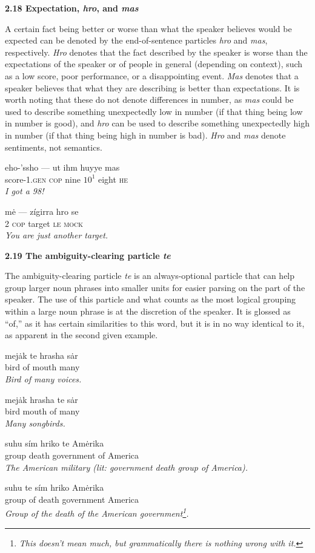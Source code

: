 \documentclass{article}[10pt]
\begin{document}
{\bf 2.18 Expectation, \emph{hro}, and \emph{mas}}

A certain fact being better or worse than what the speaker believes would be expected can be denoted by the end-of-sentence particles \emph{hro} and \emph{mas}, respectively. \emph{Hro} denotes that the fact described by the speaker is worse than the expectations of the speaker or of people in general (depending on context), such as a low score, poor performance, or a disappointing event. \emph{Mas} denotes that a speaker believes that what they are describing is better than expectations. It is worth noting that these do not denote differences in number, as \emph{mas} could be used to describe something unexpectedly low in number (if that thing being low in number is good), and \emph{hro} can be used to describe something unexpectedly high in number (if that thing being high in number is bad). \emph{Hro} and \emph{mas} denote sentiments, not semantics.
\begin{exe}
\ex 
\gll eho-'ssho --- ut ihm huyye mas\\
score-\textsc{1.gen} \textsc{cop} nine $10^1$ eight \textsc{he}\\
\trans \emph{I got a 98!}

\ex
\gll m\.{e} --- z\'{i}girra hro se\\
2 \textsc{cop} target \textsc{le} \textsc{mock}\\
\trans \emph{You are just another target.}
\end{exe}

{\bf 2.19 The ambiguity-clearing particle \emph{te}}

The ambiguity-clearing particle \emph{te} is an always-optional particle that can help group larger noun phrases into smaller units for easier parsing on the part of the speaker. The use of this particle and what counts as the most logical grouping within a large noun phrase is at the discretion of the speaker. It is glossed as ``of,'' as it has certain similarities to this word, but it is in no way identical to it, as apparent in the second given example.
\begin{exe}
\ex
\gll mej\.{a}k te hrasha s\.{a}r\\
bird of mouth many\\
\trans \emph{Bird of many voices.}

\ex
\gll mej\.{a}k hrasha te s\.{a}r\\
bird mouth of many\\
\trans \emph{Many songbirds.}

\ex
\gll suhu s\'{i}m hriko te Am\.{e}rika\\
group death government of America\\
\trans \emph{The American military (\emph{lit: government death group of America}).}

\ex
\gll suhu te s\'{i}m hriko Am\.{e}rika\\
group of death government America\\
\trans \emph{Group of the death of the American government\footnote{\emph{This doesn't mean much, but grammatically there is nothing wrong with it.}}.}
\end{exe}
\end{document}
